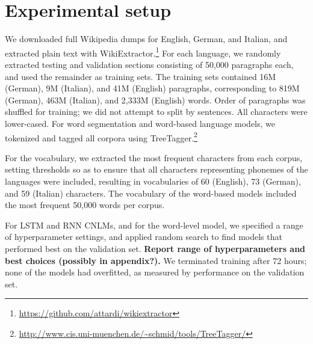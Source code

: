 \section{Experimental setup}
\label{sec:setup}

We downloaded full Wikipedia dumps for English, German, and Italian, and extracted plain text with WikiExtractor.\footnote{\url{https://github.com/attardi/wikiextractor}}
For each language, we randomly extracted testing and validation sections consisting of 50,000 paragraphs each, and used the remainder as training sets.
The training sets contained 16M (German), 9M (Italian), and 41M (English) paragraphs, corresponding to 819M (German), 463M (Italian), and 2,333M (English) words.
Order of paragraphs was shuffled for training; we did not attempt to split by sentences.
All characters were lower-cased.
For word segmentation and word-based language models, we tokenized and tagged all corpora using TreeTagger.\footnote{\url{http://www.cis.uni-muenchen.de/~schmid/tools/TreeTagger/}}

For the vocabulary, we extracted the most frequent characters from
each corpus, setting thresholds so as to ensure that all characters
representing phonemes of the languages were included, resulting in vocabularies of 60 (English), 73 (German), and 59 (Italian) characters.
The vocabulary of the word-based models
included the most frequent 50,000 words per corpus.


For LSTM and RNN CNLMs, and for the word-level model, we specified a range of hyperparameter settings, and applied random search to find models that performed best on the validation set. \textbf{Report range of hyperparameters and best choices (possibly in appendix?).}
We terminated training after 72 hours; none of the models had overfitted, as measured by performance on the validation set.

